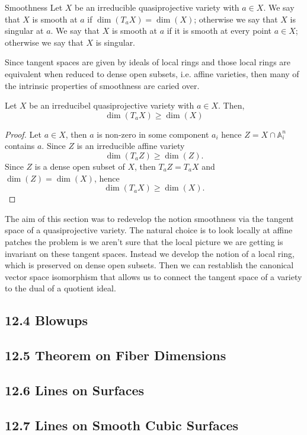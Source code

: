 \documentclass[40pt]{article}
\newcommand{\A}{\mathbb{A}}
\theoremstyle{remark}
\begin{document}
		\begin{mydef}{Smoothness}
			Let $X$ be an irreducible quasiprojective variety with $a \in X$. We say that $X$ is smooth at $a$ if $\dim(T_aX) = \dim(X)$; otherwise we say that $X$ is singular at $a$. We say that $X$ is smooth at $a$ if it is smooth at every point $a \in X$; otherwise we say that $X$ is singular. 
		\end{mydef}
		Since tangent spaces are given by ideals of local rings and those local rings are equivalent when reduced to dense open subsets, i.e. affine varieties, then many of the intrinsic properties of smoothness are caried over. 
		\begin{prop}
			Let $X$ be an irreducibel quasiprojective variety with $a \in X$. Then, 
			\[
			\dim(T_aX) \geq \dim(X)
			\]
		\end{prop}
		\begin{proof}
			Let $a \in X$, then $a$ is non-zero in some component $a_i$ hence $Z = X \cap \A_i^n$ contains $a$. Since $Z$ is an irreducible affine variety 
			\[
			\dim(T_aZ) \geq \dim(Z) \tag{Lemma 7.23}.
			\]
			Since $Z$ is a dense open subset of $X$, then $T_aZ = T_aX$ and $\dim(Z) = \dim(X)$, hence 
			\[
			\dim(T_aX) \geq \dim(X).
			\]
		\end{proof}
		\begin{summary}
			The aim of this section was to redevelop the notion smoothness via the tangent space of a quasiprojective variety. The natural choice is to look locally at affine patches the problem is we aren't sure that the local picture we are getting is invariant on these tangent spaces. Instead we develop the notion of a local ring, which is preserved on dense open subsets. Then we can restablish the canonical vector space isomorphism that allows us to connect the tangent space of a variety to the dual of a quotient ideal. 
		\end{summary}
		\subsection{12.4 Blowups}
		\subsection{12.5 Theorem on Fiber Dimensions}
		\subsection{12.6 Lines on Surfaces}
		\subsection{12.7 Lines on Smooth Cubic Surfaces}
	
\end{document}
